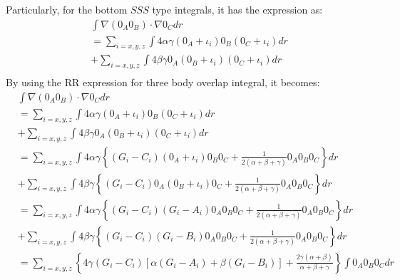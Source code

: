 Particularly, for the bottom $SSS$ type integrals, it has the expression as:
\begin{equation}
\begin{split}
 &\int \nabla(0_{A}0_{B}) \cdot \nabla 0_{C} dr \\
 &= \sum_{i = x, y, z} \int 
 4\alpha\gamma   (0_{A}+\iota_{i})0_{B}(0_{C}+\iota_{i}) dr \\ 
 &+ \sum_{i = x, y, z} \int 
 4\beta\gamma    0_{A}(0_{B}+\iota_{i})(0_{C}+\iota_{i}) dr \\
\end{split}
\label{three_body_kinetic_integral_eq:5}
\end{equation}
By using the RR expression for three body overlap integral, it becomes:
\begin{equation}
 \begin{split}
 &\int \nabla(0_{A}0_{B}) \cdot \nabla 0_{C} dr \\
 &= \sum_{i = x, y, z} \int 
 4\alpha\gamma   (0_{A}+\iota_{i})0_{B}(0_{C}+\iota_{i}) dr \\ 
 &+ \sum_{i = x, y, z} \int 
 4\beta\gamma    0_{A}(0_{B}+\iota_{i})(0_{C}+\iota_{i}) dr \\
 &= \sum_{i = x, y, z} \int 
 4\alpha\gamma\left\lbrace (G_{i}-C_{i})(0_{A}+\iota_{i})0_{B}0_{C}
 +\frac{1}{2(\alpha+\beta+\gamma)}0_{A}0_{B}0_{C} \right\rbrace dr \\
 &+ \sum_{i = x, y, z} \int 
 4\beta\gamma \left\lbrace (G_{i}-C_{i})0_{A}(0_{B}+\iota_{i})0_{C}
 +\frac{1}{2(\alpha+\beta+\gamma)}0_{A}0_{B}0_{C} \right\rbrace dr \\
 &= \sum_{i = x, y, z} \int 
 4\alpha\gamma\left\lbrace (G_{i}-C_{i})(G_{i}-A_{i})0_{A}0_{B}0_{C}
 +\frac{1}{2(\alpha+\beta+\gamma)}0_{A}0_{B}0_{C} \right\rbrace dr \\
 &+ \sum_{i = x, y, z} \int 
 4\beta\gamma \left\lbrace (G_{i}-C_{i})(G_{i}-B_{i})0_{A}0_{B}0_{C}
 +\frac{1}{2(\alpha+\beta+\gamma)}0_{A}0_{B}0_{C} \right\rbrace dr \\ 
 &= \sum_{i = x, y, z} \left\lbrace 
 4\gamma(G_{i}-C_{i}) \left[ \alpha(G_{i}-A_{i}) + \beta(G_{i}-B_{i})\right] 
 + \frac{2\gamma(\alpha+\beta)}{\alpha+\beta+\gamma}
 \right\rbrace \int 0_{A}0_{B}0_{C} dr
\end{split}
\label{three_body_kinetic_integral_eq:6}
\end{equation}


\begin{comment}
 &+ \sum_{i = x, y, z} \int \Bigl{ 
\chi_{A}(r) \left[ 
N_{i}(B)(\chi_{B}-\iota_{i}) - 2\beta(\chi_{B}+\iota_{i})\right]
\left[ N_{i}(C)(\chi_{C}-\iota_{i}) - 2\gamma(\chi_{C}+\iota_{i})\right] \Bigr} dr
\end{comment}




